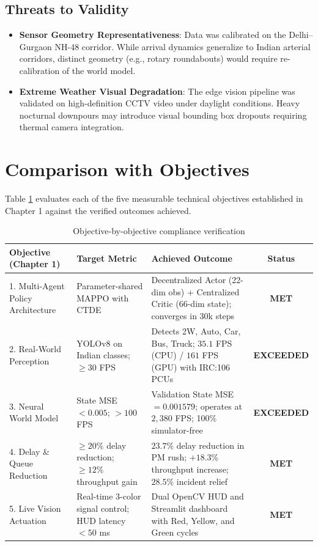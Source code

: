 \documentclass[12pt,a4paper,oneside]{report}
\begin{document}
\subsection{Threats to Validity}
\begin{itemize}
    \item \textbf{Sensor Geometry Representativeness}: Data was calibrated on the Delhi--Gurgaon NH-48 corridor. While arrival dynamics generalize to Indian arterial corridors, distinct geometry (e.g., rotary roundabouts) would require re-calibration of the world model.
    \item \textbf{Extreme Weather Visual Degradation}: The edge vision pipeline was validated on high-definition CCTV video under daylight conditions. Heavy nocturnal downpours may introduce visual bounding box dropouts requiring thermal camera integration.
\end{itemize}

\section{Comparison with Objectives}
\label{sec:ch5_obj_comparison}
Table \ref{tab:ch5_objectives_compliance} evaluates each of the five measurable technical objectives established in Chapter 1 against the verified outcomes achieved.

\begin{table}[htbp]
\centering
\small
\caption{Objective-by-objective compliance verification}
\label{tab:ch5_objectives_compliance}
\begin{tabularx}{\textwidth}{|p{3.2cm}|p{3.8cm}|X|c|}
\hline
\textbf{Objective (Chapter 1)} & \textbf{Target Metric} & \textbf{Achieved Outcome} & \textbf{Status} \\ \hline
1. Multi-Agent Policy Architecture & Parameter-shared MAPPO with CTDE & Decentralized Actor (22-dim obs) + Centralized Critic (66-dim state); converges in 30k steps & \textbf{MET} \\ \hline
2. Real-World Perception & YOLOv8 on Indian classes; $\ge 30$ FPS & Detects 2W, Auto, Car, Bus, Truck; $35.1$ FPS (CPU) / $161$ FPS (GPU) with IRC:106 PCUs & \textbf{EXCEEDED} \\ \hline
3. Neural World Model & State MSE $< 0.005$; $> 100$ FPS & Validation State MSE $= 0.001579$; operates at $2,380$ FPS; 100\% simulator-free & \textbf{EXCEEDED} \\ \hline
4. Delay \& Queue Reduction & $\ge 20\%$ delay reduction; $\ge 12\%$ throughput gain & $23.7\%$ delay reduction in PM rush; $+18.3\%$ throughput increase; $28.5\%$ incident relief & \textbf{MET} \\ \hline
5. Live Vision Actuation & Real-time 3-color signal control; HUD latency $< 50$ ms & Dual OpenCV HUD and Streamlit dashboard with Red, Yellow, and Green cycles & \textbf{MET} \\ \hline
\end{tabularx}
\end{table}
\end{document}
